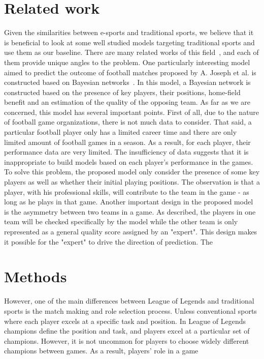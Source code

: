 \documentclass{article} %
\begin{document}
\section{Related work}
Given the similarities between e-sports and traditional sports, we believe that it is beneficial to look at some well studied models targeting traditional sports and use them as our baseline. There are many related works of this field~\cite{Joseph2006544}\cite{Min2008551}, and each of them provide unique angles to the problem. One particularly interesting model aimed to predict the outcome of football matches proposed by {A. Joseph et al.} is constructed based on Bayesian networks~\cite{Joseph2006544}. In this model, a Bayesian network is constructed based on the presence of key players, their positions, home-field benefit and an estimation of the quality of the opposing team. As far as we are concerned, this model has several important points. First of all, due to the nature of football game organizations, there is not much data to consider. That said, a particular football player only has a limited career time and there are only limited amount of football games in a season. As a result, for each player, their performance data are very limited. The insufficiency of data suggests that it is inappropriate to build models based on each player's performance in the games. To solve this problem, the proposed model only consider the presence of some key players as well as whether their initial playing positions. The observation is that a player, with his professional skills, will contribute to the team in the game - as long as he plays in that game. Another important design in the proposed model is the asymmetry between two teams in a game. As described, the players in one team will be checked specifically by the model while the other team is only represented as a general quality score assigned by an "expert". This design makes it possible for the "expert" to drive the direction of prediction. The 

\section{Methods}
However, one of the main differences between League of Legends and traditional sports is the match making and role selection process. Unless conventional sports where each player excels at a specific task and position. In League of Legends champions define the position and task, and players excel at a particular set of champions. However, it is not uncommon for players to choose widely different champions between games. As a result, players' role in a game 
\end{document}
